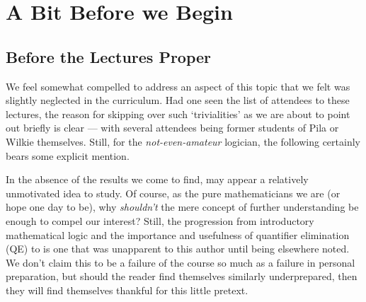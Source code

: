 %
%
%
\chapter{A Bit Before we Begin}
\label{bit-before} %



\section{Before the Lectures Proper}
We feel somewhat compelled to address an aspect of this topic that we felt was slightly neglected in the curriculum. Had one seen the list of attendees to these lectures, the reason for skipping over such `trivialities' as we are about to point out briefly is clear — with several attendees being former students of Pila or Wilkie themselves. Still, for the \emph{not-even-amateur} logician, the following certainly bears some explicit mention.

In the absence of the results we come to find, \omy may appear a relatively unmotivated idea to study. Of course, as the pure mathematicians we are (or hope one day to be), why \emph{shouldn't} the mere concept of further understanding be enough to compel our interest? Still, the progression from introductory mathematical logic and the importance and usefulness of quantifier elimination (QE) to \omy is one that was unapparent to this author until being elsewhere noted. We don't claim this to be a failure of the course so much as a failure in personal preparation, but should the reader find themselves similarly underprepared, then they will find themselves thankful for this little pretext.

